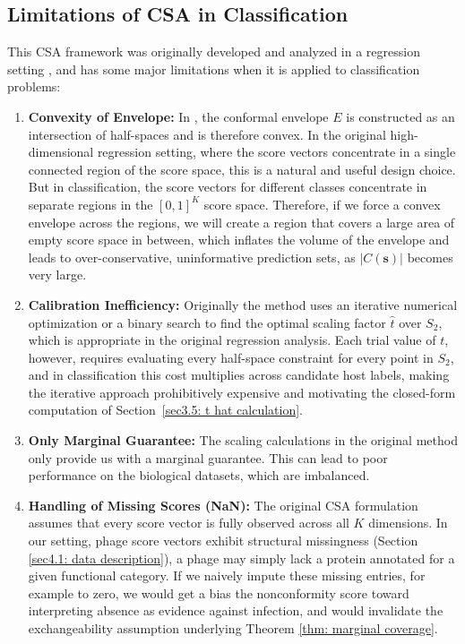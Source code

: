 \subsection{Limitations of CSA in Classification}
\label{sec2.4.3: csa limitations}
This CSA framework was originally developed and analyzed in a regression setting \cite{ochoarivera2024conformal}, 
and has some major limitations when it is applied to classification problems:
\begin{enumerate}[label=(\roman*)]
\item \textbf{Convexity of Envelope:} In \cite{ochoarivera2024conformal}, the conformal envelope $E$ is constructed 
      as an intersection of half-spaces and is therefore convex. In the original high-dimensional regression setting, 
      where the score vectors concentrate in a single connected region of the score space, this is a natural and useful 
      design choice. But in classification, the score vectors for different classes concentrate in separate regions in 
      the $[0, 1]^K$ score space. Therefore, if we force a convex envelope across the regions, we will create a region 
      that covers a large area of empty score space in between, which inflates the volume of the envelope and leads to 
      over-conservative, uninformative prediction sets, as $|C(\mathbf{s})|$ becomes very large.
\item \textbf{Calibration Inefficiency:} Originally the method uses an iterative numerical optimization or a binary search 
      to find the optimal scaling factor $\hat{t}$ over $S_2$, which is appropriate in the original regression analysis. 
      Each trial value of $t$, however, requires evaluating every half-space constraint for every point in $S_2$, and in 
      classification this cost multiplies across candidate host labels, making the iterative approach prohibitively 
      expensive and motivating the closed-form computation of Section~\ref{sec3.5: t hat calculation}.
\item \textbf{Only Marginal Guarantee:} The scaling calculations in the original method only provide us with a 
      marginal guarantee. This can lead to poor performance on the biological datasets, which are imbalanced.
      \newpage
\item \textbf{Handling of Missing Scores (NaN):} The original CSA formulation assumes that every score vector is fully 
      observed across all $K$ dimensions. In our setting, phage score vectors exhibit structural missingness (Section 
      \ref{sec4.1: data description}), a phage may simply lack a protein annotated for a given functional category. 
      If we naively impute these missing entries, for example to zero, we would get a bias the nonconformity score 
      toward interpreting absence as evidence against infection, and would invalidate the exchangeability assumption 
      underlying Theorem \ref{thm: marginal coverage}. 
\end{enumerate}

